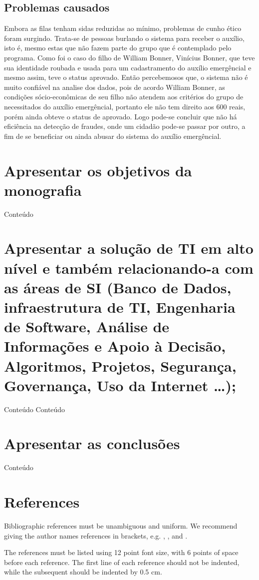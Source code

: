 \documentclass[12pt]{article}
\begin{document}
\subsection{Problemas causados}
	Embora as filas tenham sidas reduzidas ao mínimo, problemas de cunho ético foram surgindo. Trata-se de pessoas burlando o sistema para receber o auxílio, isto é, mesmo estas que não fazem parte do grupo que é contemplado pelo programa. Como foi o caso do filho de William Bonner, Vinícius Bonner, que teve sua identidade roubada e usada para um cadastramento do auxílio emergêncial e mesmo assim, teve o status aprovado.
\linebreak
\linebreak
	Então percebemosos que, o sistema não é muito confiável na analise dos dados, pois de acordo William Bonner, as condições sócio-econômicas de seu filho não atendem aos critérios do grupo de necessitados do auxílio emergêncial, portanto ele não tem direito aos 600 reais, porém ainda obteve o status de aprovado. Logo pode-se concluir que não há eficiência na detecção de fraudes, onde um cidadão pode-se passar por outro, a fim de se beneficiar ou ainda abusar do sistema do auxílio emergêncial. 
\section{Apresentar os objetivos da monografia}
Conteúdo

\section{Apresentar a solução de TI em alto nível e também relacionando-a com as áreas de SI (Banco de Dados, infraestrutura de TI, Engenharia de Software, Análise de Informações e Apoio à Decisão, Algoritmos, Projetos, Segurança, Governança, Uso da Internet …);}
Conteúdo
\linebreak
\linebreak
Conteúdo

\section{Apresentar as conclusões}
Conteúdo

\section{References}

Bibliographic references must be unambiguous and uniform.  We recommend giving
the author names references in brackets, e.g. \cite{knuth:84},
\cite{boulic:91}, and \cite{smith:99}.

The references must be listed using 12 point font size, with 6 points of space
before each reference. The first line of each reference should not be
indented, while the subsequent should be indented by 0.5 cm.



\end{document}
